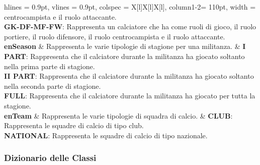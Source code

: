 \begin{tblr}{
	hlines = {0.9pt}, vlines = {0.9pt}, colspec = {X[l]X[l]X[l]}, column{1-2}= {110pt},
    width = \textwidth
}
{			centrocampista e il ruolo attaccante.\\
		\medskip\textbf{GK-DF-MF-FW}: Rappresenta un calciatore che ha
			come ruoli di gioco, il ruolo portiere, il ruolo difensore,
			il ruolo centrocampista e il ruolo attaccante.	
	}
	\\
	{
		\textbf{enSeason}
	}
	&
	{
		Rappresenta le varie tipologie di stagione per una militanza.
	}
	&
	{
		\textbf{I PART}: Rappresenta che il calciatore durante la militanza
			ha giocato soltanto nella prima parte di stagione.\\
		\medskip\textbf{II PART}: Rappresenta che il calciatore durante
			la militanza ha giocato soltanto nella seconda parte
			di stagione.\\
		\medskip\textbf{FULL}: Rappresenta che il calciatore durante
			la militanza ha giocato per tutta la stagione.
	}
	\\
	{
		\textbf{enTeam}
	}
	&
	{
		Rappresenta le varie tipologie di squadra di calcio.
	}
	&
	{
		\textbf{CLUB}: Rappresenta le squadre di calcio di tipo club.\\
		\medskip\textbf{NATIONAL}: Rappresenta le squadre di calcio di
			tipo nazionale.
	}
	\\
\end{tblr}

\newpage

\subsubsection{Dizionario delle Classi}



